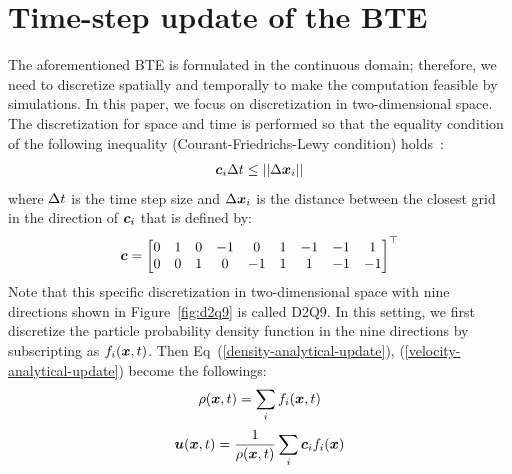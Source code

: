\section{Time-step update of the BTE}
The aforementioned BTE is formulated in the 
continuous domain; therefore,
we need to discretize spatially and 
temporally to make the computation 
feasible by simulations.
In this paper, we focus on discretization
in two-dimensional space.
The discretization for space and time
is performed so that the equality condition of 
the following inequality
(Courant-Friedrichs-Lewy condition) holds~\cite{peyretcomputational, sterling1996stability}:
\begin{equation}
\begin{aligned}
  \boldsymbol{c}_i \Delta t \leq || \Delta \boldsymbol{x}_i ||
\end{aligned}
\end{equation}
where $\Delta t$ is the time step size 
and $\Delta \boldsymbol{x}_i$ is the distance between 
the closest grid in the direction
of $\boldsymbol{c}_i$ that is defined by:
\begin{equation}
\begin{aligned}
  \boldsymbol{c} = \begin{bmatrix}
    0 & 1 & 0 & -1 & 0 & 1 & -1 & -1 & 1 \\
    0 & 0 & 1 & 0 & -1 & 1 & 1 & -1 & -1 \\
  \end{bmatrix}^\top
\end{aligned}
\label{d2q9-velocity}
\end{equation}
Note that this specific discretization in two-dimensional
space with nine directions shown in 
Figure~\ref{fig:d2q9} is called D2Q9.
In this setting, 
we first discretize
the particle probability density function
in the nine directions by subscripting 
as $f_i(\boldsymbol{x}, t)$.
Then Eq~(\ref{density-analytical-update}), (\ref{velocity-analytical-update})
become the followings:
\begin{equation}
  \begin{aligned}
    \rho(\boldsymbol{x}, t) &= \sum_i f_i(\boldsymbol{x}, t) \\
  \end{aligned}
  \label{discretized-density}
\end{equation}
\begin{equation}
\begin{aligned}
  \boldsymbol{u}(\boldsymbol{x}, t) &= 
  \frac{1}{\rho(\boldsymbol{x}, t)} \sum_i \boldsymbol{c}_i f_i(\boldsymbol{x}) \\
\end{aligned}
\label{discretized-velocity}
\end{equation}
